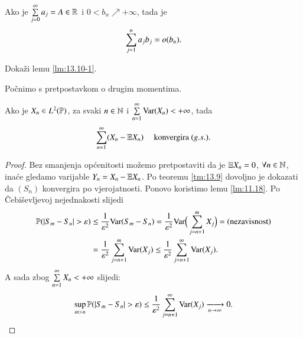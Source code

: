 \begin{lm}  \label{lm:13.10-1}
    Ako je $\sum\limits_{j = 0}^{\infty} a_j = A \in \mathbb{R}$ i $0 < b_n \nearrow +\infty$, tada je
    \begin{equation*}
        \sum\limits_{j = 1}^{n} a_j b_j = o(b_n).
    \end{equation*}
\end{lm}

\begin{zad} \label{zad:13.11}
    Doka\v zi lemu \ref{lm:13.10-1}.
\end{zad}

Po\v cnimo s pretpostavkom o drugim momentima.

\begin{tm}  \label{tm:13.12}
    Ako je $X_n \in L^2 (\mathbb{P})$, za svaki $n \in \mathbb{N}$ i $\sum\limits_{n = 1}^{\infty} \mathrm{Var} (X_n) < +\infty$, tada
    \begin{equation*}
        \sum\limits_{n = 1}^{\infty} (X_n - \mathbb{E} X_n) \quad \textnormal{ konvergira } (g.s.).
    \end{equation*}
\end{tm}

\begin{proof}
    Bez smanjenja op\' cenitosti mo\v zemo pretpostaviti da je $\mathbb{E} X_n = 0$, $\forall n \in \mathbb{N}$, ina\' ce gledamo varijable $Y_n = X_n - \mathbb{E} X_n$.
    Po teoremu \ref{tm:13.9} dovoljno je dokazati da $(S_n)$ konvergira po vjerojatnosti.
    Ponovo koristimo lemu \ref{lm:11.18}.
    Po \v Cebi\v sevljevoj nejednakosti slijedi
    \begin{equation*}
        \begin{aligned}
            \mathbb{P}({|S_m - S_n| > \varepsilon}) &\leq \frac{1}{\varepsilon^2} \mathrm{Var} (S_m - S_n) = \frac{1}{\varepsilon^2} \mathrm{Var} \Big( \sum\limits_{j = n + 1}^{m} X_j \Big) = (\textnormal{nezavisnost})\\
            &= \frac{1}{\varepsilon^2} \sum\limits_{j = n + 1}^{m} \mathrm{Var} (X_j) \leq \frac{1}{\varepsilon^2} \sum\limits_{j = n + 1}^{\infty} \mathrm{Var} (X_j).
        \end{aligned}
    \end{equation*}
    A sada zbog $\sum\limits_{n = 1}^{\infty} X_n < +\infty$ slijedi:
    \begin{equation*}
        \sup\limits_{m > n} \mathbb{P}({|S_m - S_n| > \varepsilon}) \leq \frac{1}{\varepsilon^2} \sum\limits_{j = n + 1}^{\infty} \mathrm{Var} (X_j) \xrightarrow[n \to \infty]{} 0.
    \end{equation*}
\end{proof}

